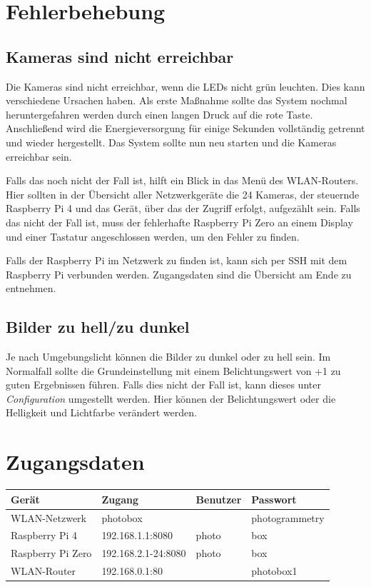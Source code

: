 \documentclass[./00PhotoBox.tex]{subfiles}
\begin{document}
\section{Fehlerbehebung}
\label{sec:Fehlerbehebung}
\subsection{Kameras sind nicht erreichbar}
Die Kameras sind nicht erreichbar, wenn die LEDs nicht grün leuchten. Dies kann verschiedene Ursachen haben. Als erste Maßnahme sollte das System nochmal heruntergefahren werden durch einen langen Druck auf die rote Taste. Anschließend wird die Energieversorgung für einige Sekunden vollständig getrennt und wieder hergestellt. Das System sollte nun neu starten und die Kameras erreichbar sein.

Falls das noch nicht der Fall ist, hilft ein Blick in das Menü des WLAN-Routers. Hier sollten in der Übersicht aller Netzwerkgeräte die 24 Kameras, der steuernde Raspberry Pi 4 und das Gerät, über das der Zugriff erfolgt, aufgezählt sein. Falls das nicht der Fall ist, muss der fehlerhafte Raspberry Pi Zero an einem Display und einer Tastatur angeschlossen werden, um den Fehler zu finden.

Falls der Raspberry Pi im Netzwerk zu finden ist, kann sich per SSH mit dem Raspberry Pi verbunden werden. Zugangsdaten sind die Übersicht am Ende zu entnehmen.

\subsection{Bilder zu hell/zu dunkel}
Je nach Umgebungslicht können die Bilder zu dunkel oder zu hell sein. Im Normalfall sollte die Grundeinstellung mit einem Belichtungswert von +1 zu guten Ergebnissen führen. Falls dies nicht der Fall ist, kann dieses unter \textit{\foreignlanguage{british}{Configuration}} umgestellt werden. Hier können der Belichtungswert oder die Helligkeit und Lichtfarbe verändert werden.


\section{Zugangsdaten}

\begin{tabular}{|l|l|l|l|}
    \hline
    \textbf{Gerät}    & \textbf{Zugang}     & \textbf{Benutzer} & \textbf{Passwort} \\
    \hline
    WLAN-Netzwerk     & photobox            &                   & photogrammetry    \\
    \hline
    Raspberry Pi 4    & 192.168.1.1:8080    & photo             & box               \\
    \hline
    Raspberry Pi Zero & 192.168.2.1-24:8080 & photo             & box               \\
    \hline
    WLAN-Router       & 192.168.0.1:80      &                   & photobox1         \\
    \hline
\end{tabular}

\biblio
\end{document}
